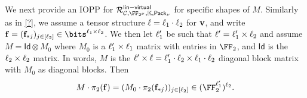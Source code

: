 \documentclass[11pt,letterpaper,usenames,dvipsnames]{article}
\begin{document}
\bigskip

We next provide an IOPP for $\Relation^{\mathsf{lin-virtual}}_{\cC, \comfield, \evalfield, \pack}$ for specific shapes of $M$. Similarly as in \cref{?}, we assume a tensor structure $\ell=\ell_1 \cdot \ell_2$ for $\mathbf{v}$, and write $\bff = (\bff_{*j})_{j\in [\codedim_2]} \in \bits^{\codedim_1 \times \codedim_2}$.  We then let $\ell_1'$ be such that $\ell' = \ell_1' \times \ell_2$ and assume $M = \mathsf{Id} \otimes M_0$ where $M_0$ is a $\ell_1' \times \ell_1$ matrix with entries in $\FF_2$, and $\mathsf{Id}$ is the $\ell_2\times \ell_2$ matrix. In words, $M$ is the $\ell'\times \ell = \ell_1'\cdot \ell_2 \times \ell_1\cdot \ell_2$ diagonal block matrix with $M_0$ as diagonal blocks. Then
%
\begin{equation}\label{e:M_pi_f}
M \cdot \pi_2(\bff) = (M_0 \cdot \pi_2(\bff_{*j}))_{j\in [\codedim_2]} \in (\FF_2^{\codedim_1'})^{\codedim_2}.
\end{equation}
%
\end{document}
